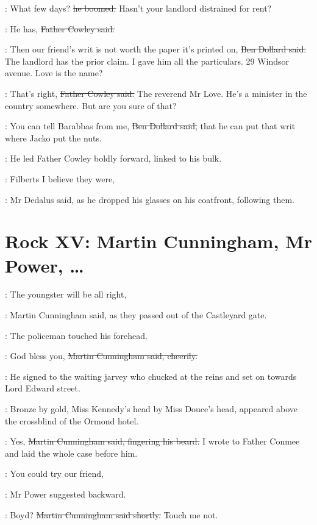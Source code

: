 \dollard:
What few days?
\sout{he boomed.}
Hasn't your landlord distrained for rent?

\cowley:
He has,
\sout{Father Cowley said.}

\dollard:
Then our friend's writ is not worth the paper it's printed on,
\sout{Ben Dollard said.}
The landlord has the prior claim.
I gave him all the particulars.
29 Windsor avenue.
Love is the name?

\cowley:
That's right,
\sout{Father Cowley said.}
The reverend Mr Love.
He's a minister in the country somewhere.
But are you sure of that?

\dollard:
You can tell Barabbas from me,
\sout{Ben Dollard said,}
that he can put that writ where Jacko put the nuts.

:
He led Father Cowley boldly forward,
linked to his bulk.

\simon:
Filberts I believe they were,

:
Mr Dedalus said,
as he dropped his
glasses on his coatfront,
following them.


\section*{Rock XV: Martin Cunningham, Mr Power, \ldots}


\cunningham:
The youngster will be all right,

:
Martin Cunningham said,
as they passed
out of the Castleyard gate.

:
The policeman touched his forehead.

\cunningham:
God bless you,
\sout{Martin Cunningham said, cheerily.}

:
He signed to the waiting jarvey
who chucked at the reins
and set on towards Lord Edward street.

\begin{interject}
    :
    Bronze by gold,
    Miss Kennedy's head by Miss Douce's head,
    appeared above
    the crossblind of the Ormond hotel.
\end{interject}

\cunningham:
Yes,
\sout{Martin Cunningham said,
fingering his beard.}
I wrote to Father Conmee and laid the whole case before him.

\power:
You could try our friend,

:
Mr Power suggested backward.

\cunningham:
Boyd?
\sout{Martin Cunningham said shortly.}
Touch me not.

